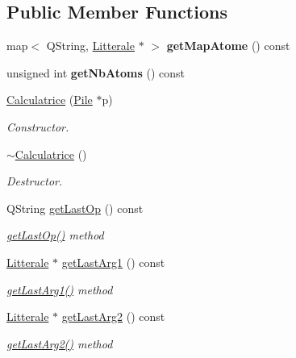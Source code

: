 \subsection*{Public Member Functions}
\begin{DoxyCompactItemize}
\item 
map$<$ Q\+String, \hyperlink{class_litterale}{Litterale} $\ast$ $>$ {\bfseries get\+Map\+Atome} () const \hypertarget{class_calculatrice_a7052dd37aa1976d3deef76e4a0ba8d79}{}\label{class_calculatrice_a7052dd37aa1976d3deef76e4a0ba8d79}

\item 
unsigned int {\bfseries get\+Nb\+Atoms} () const \hypertarget{class_calculatrice_a3a4fad24caff85518b77c61adc5e730e}{}\label{class_calculatrice_a3a4fad24caff85518b77c61adc5e730e}

\item 
\hyperlink{class_calculatrice_a2350ed13f91c824c7cd6c4a65ab42dde}{Calculatrice} (\hyperlink{class_pile}{Pile} $\ast$p)
\begin{DoxyCompactList}\small\item\em Constructor. \end{DoxyCompactList}\item 
\hyperlink{class_calculatrice_acb4b6278eb955ce932e16df29276be52}{$\sim$\+Calculatrice} ()
\begin{DoxyCompactList}\small\item\em Destructor. \end{DoxyCompactList}\item 
Q\+String \hyperlink{class_calculatrice_a05f1ea7ed7113ee8d4f92fd13d6e9591}{get\+Last\+Op} () const 
\begin{DoxyCompactList}\small\item\em \hyperlink{class_calculatrice_a05f1ea7ed7113ee8d4f92fd13d6e9591}{get\+Last\+Op()} method \end{DoxyCompactList}\item 
\hyperlink{class_litterale}{Litterale} $\ast$ \hyperlink{class_calculatrice_adb12970d2534774f003cc790b2a87f43}{get\+Last\+Arg1} () const 
\begin{DoxyCompactList}\small\item\em \hyperlink{class_calculatrice_adb12970d2534774f003cc790b2a87f43}{get\+Last\+Arg1()} method \end{DoxyCompactList}\item 
\hyperlink{class_litterale}{Litterale} $\ast$ \hyperlink{class_calculatrice_aeb2562cb73e9140652f3de990999e795}{get\+Last\+Arg2} () const 
\begin{DoxyCompactList}\small\item\em \hyperlink{class_calculatrice_aeb2562cb73e9140652f3de990999e795}{get\+Last\+Arg2()} method \end{DoxyCompactList}\item 

\end{DoxyCompactItemize}

